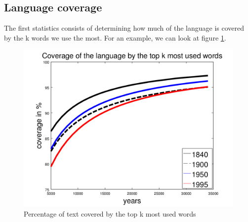 \subsection{Language coverage}

The first statistics consists of determining how much of the language is covered by the k words we use the most. For an example, we can look at figure \ref{coverage_figure}.

\begin{figure}[H]
	\centering
    \begin{minipage}[b]{0.48\linewidth}
        \includegraphics[scale=0.15]{Pictures/statistics/top-k-words-coverage/coverage.png}
        \caption{Percentage of text covered by the top k most used words}
        \label{coverage_figure}
    \end{minipage}\hfill
\end{figure}